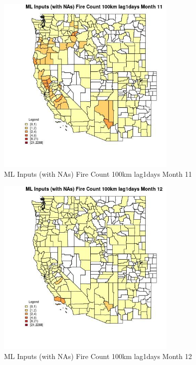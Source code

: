 \begin{figure} 
\centering  
\includegraphics[width=0.77\textwidth]{Code_Outputs/Report_ML_input_PM25_Step4_part_e_de_duplicated_aves_compiled_2019-05-21wNAs_CountyFire_Count_100km_lag1daysmedianMonth11.jpg} 
\caption{\label{fig:Report_ML_input_PM25_Step4_part_e_de_duplicated_aves_compiled_2019-05-21wNAsCountyFire_Count_100km_lag1daysmedianMonth11}ML Inputs (with NAs) Fire Count 100km lag1days Month 11} 
\end{figure} 
 

\begin{figure} 
\centering  
\includegraphics[width=0.77\textwidth]{Code_Outputs/Report_ML_input_PM25_Step4_part_e_de_duplicated_aves_compiled_2019-05-21wNAs_CountyFire_Count_100km_lag1daysmedianMonth12.jpg} 
\caption{\label{fig:Report_ML_input_PM25_Step4_part_e_de_duplicated_aves_compiled_2019-05-21wNAsCountyFire_Count_100km_lag1daysmedianMonth12}ML Inputs (with NAs) Fire Count 100km lag1days Month 12} 
\end{figure} 
 

